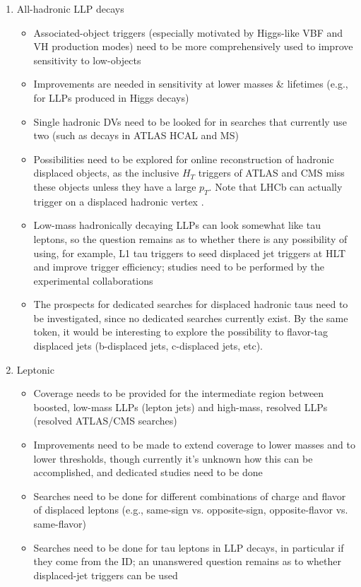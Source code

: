 \begin{enumerate}
\item All-hadronic LLP decays
	\begin{itemize}
	\item Associated-object triggers (especially motivated by Higgs-like VBF and VH production modes) need to be more comprehensively used to improve sensitivity to low-\pT objects
	\item Improvements are needed in sensitivity at lower masses \& lifetimes (e.g., for LLPs produced in Higgs decays)
	\item Single hadronic DVs need to be looked for in searches that currently use two (such as decays in ATLAS HCAL and MS)
	\item Possibilities need to be explored for online reconstruction of hadronic displaced objects, as the inclusive $H_T$ triggers of ATLAS and CMS miss these objects unless they have a large $p_T$. Note that LHCb can actually trigger on a displaced hadronic vertex \cite{Aaij:2016isa,Aaij:2017mic}.
	\item Low-mass hadronically decaying LLPs can look somewhat like tau leptons, so the question remains as to whether there is any possibility of using, for example, L1 tau triggers to seed displaced jet triggers at HLT and improve trigger efficiency; studies need to be performed by the experimental collaborations
	\item The prospects for dedicated searches for displaced hadronic taus need to be investigated, since no dedicated searches currently exist. By the same token, it would be interesting to explore the possibility to flavor-tag displaced jets (b-displaced jets, c-displaced jets, etc).
	\end{itemize}

\item Leptonic
	\begin{itemize}
	\item Coverage needs to be provided for the intermediate region between boosted, low-mass LLPs (lepton jets) and high-mass, resolved LLPs (resolved ATLAS/CMS searches)
	\item Improvements need to be made to extend coverage to lower masses and to lower \pT thresholds, though currently it's unknown how this can be accomplished, and dedicated studies need to be done
	\item Searches need to be done for different combinations of charge and flavor of displaced leptons (e.g., same-sign vs. opposite-sign, opposite-flavor vs. same-flavor)
	\item Searches need to be done for tau leptons in LLP decays, in particular if they come from the ID; an unanswered question remains as to whether displaced-jet triggers can be used
	\end{itemize}


\end{enumerate}
